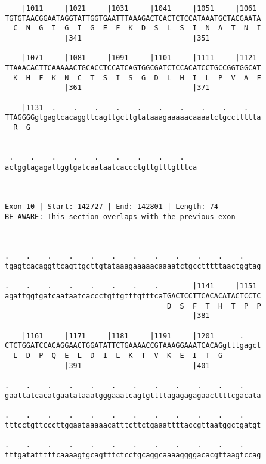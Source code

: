 \documentclass{article}
\begin{document}
\begin{Verbatim}
    |1011     |1021     |1031     |1041     |1051     |1061 
TGTGTAACGGAATAGGTATTGGTGAATTTAAAGACTCACTCTCCATAAATGCTACGAATA
  C  N  G  I  G  I  G  E  F  K  D  S  L  S  I  N  A  T  N  I
              |341                          |351            
  
    |1071     |1081     |1091     |1101     |1111     |1121 
TTAAACACTTCAAAAACTGCACCTCCATCAGTGGCGATCTCCACATCCTGCCGGTGGCAT
  K  H  F  K  N  C  T  S  I  S  G  D  L  H  I  L  P  V  A  F
              |361                          |371            
  
    |1131  .    .    .    .    .    .    .    .    .    .   
TTAGGGGgtgagtcacaggttcagttgcttgtataaagaaaaacaaaatctgccttttta
  R  G                                                      
                                                            
  
 .    .    .    .    .    .    .    .    .   
actggtagagattggtgatcaataatcaccctgttgtttgtttca
                                             
                                             
 
Exon 10 | Start: 142727 | End: 142801 | Length: 74
BE AWARE: This section overlaps with the previous exon



.    .    .    .    .    .    .    .    .    .    .    .    
tgagtcacaggttcagttgcttgtataaagaaaaacaaaatctgcctttttaactggtag
                                                            
.    .    .    .    .    .    .    .        |1141     |1151 
agattggtgatcaataatcaccctgttgtttgtttcaTGACTCCTTCACACATACTCCTC
                                      D  S  F  T  H  T  P  P
                                            |381            
  
    |1161     |1171     |1181     |1191     |1201      .    
CTCTGGATCCACAGGAACTGGATATTCTGAAAACCGTAAAGGAAATCACAGgtttgagct
  L  D  P  Q  E  L  D  I  L  K  T  V  K  E  I  T  G         
              |391                          |401            
  
.    .    .    .    .    .    .    .    .    .    .    .    
gaattatcacatgaatataaatgggaaatcagtgttttagagagagaacttttcgacata
                                                            
.    .    .    .    .    .    .    .    .    .    .    .    
tttcctgttcccttggaataaaaacatttcttctgaaattttaccgttaatggctgatgt
                                                            
.    .    .    .    .    .    .    .    .    .    .    .    
tttgatatttttcaaaagtgcagtttctcctgcaggcaaaaggggacacgttaagtccag
                                                            

\end{Verbatim}
\end{document}
